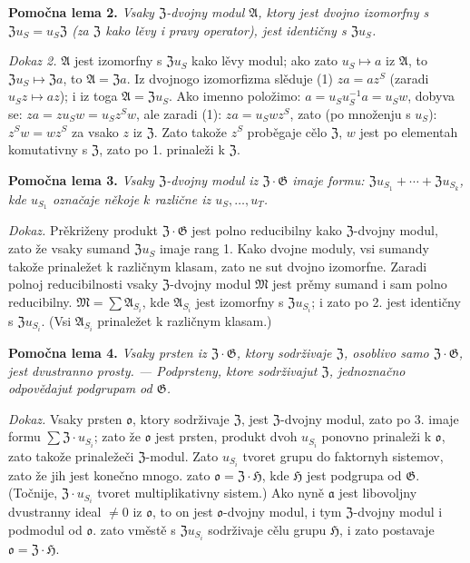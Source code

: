 \documentclass[11pt]{article}
\begin{document}
\noindent\textbf{Pomočna lema 2.} \emph{Vsaky \(\mathfrak Z\)-dvojny modul \(\mathfrak A\), ktory jest dvojno izomorfny s \(\mathfrak Zu_S=u_S\mathfrak Z\) (za \(\mathfrak Z\) kako lěvy i pravy operator), jest identičny s \(\mathfrak Zu_S\).}

\noindent\emph{Dokaz 2.} \(\mathfrak A\) jest izomorfny s \(\mathfrak Zu_S\) kako lěvy modul; ako zato \(u_S\mapsto a\) iz \(\mathfrak A\), to \(\mathfrak Zu_S\mapsto\mathfrak Za\), to \(\mathfrak A=\mathfrak Za\). Iz dvojnogo izomorfizma slěduje (1) \(za=az^S\) (zaradi \(u_Sz\mapsto az\)); i iz toga \(\mathfrak A=\mathfrak Zu_S\). Ako imenno položimo: \(a=u_Su_S^{-1}a=u_Sw\), dobyva se: \(za=zu_Sw=u_Sz^Sw\), ale zaradi (1): \(za=u_Swz^S\), zato (po množenju s \(u_S\)): \(z^Sw=wz^S\) za vsako \(z\) iz \(\mathfrak Z\). Zato takože \(z^S\) proběgaje cělo \(\mathfrak Z\), \(w\) jest po elementah komutativny s \(\mathfrak Z\), zato po 1. prinaleži k \(\mathfrak Z\).

\noindent\textbf{Pomočna lema 3.} \emph{Vsaky \(\mathfrak Z\)-dvojny modul iz \(\mathfrak Z\cdot\mathfrak G\) imaje formu: \(\mathfrak Zu_{S_1}+\cdots+\mathfrak Zu_{S_k}\), kde \(u_{S_1}\) označaje někoje \(k\) različne iz \(u_S,\ldots,u_T\).}

\noindent\emph{Dokaz.} Prěkriženy produkt \(\mathfrak Z\cdot\mathfrak G\) jest polno reducibilny kako \(\mathfrak Z\)-dvojny modul, zato že vsaky sumand \(\mathfrak Zu_S\) imaje rang 1. Kako dvojne moduly, vsi sumandy takože prinaležet k različnym klasam, zato ne sut dvojno izomorfne. Zaradi polnoj reducibilnosti vsaky \(\mathfrak Z\)-dvojny modul \(\mathfrak M\) jest prěmy sumand i sam polno reducibilny. \(\mathfrak M=\sum\mathfrak A_{S_i}\), kde \(\mathfrak A_{S_i}\) jest izomorfny s \(\mathfrak Zu_{S_i}\); i zato po 2. jest identičny s \(\mathfrak Zu_{S_i}\). (Vsi \(\mathfrak A_{S_i}\) prinaležet k različnym klasam.)

\noindent\textbf{Pomočna lema 4.} \emph{Vsaky prsten iz \(\mathfrak Z\cdot\mathfrak G\), ktory sodrživaje \(\mathfrak Z\), osoblivo samo \(\mathfrak Z\cdot\mathfrak G\), jest dvustranno prosty. --- Podprsteny, ktore sodrživajut \(\mathfrak Z\), jednoznačno odpovědajut podgrupam od \(\mathfrak G\).}

\noindent\emph{Dokaz.} Vsaky prsten \(\mathfrak o\), ktory sodrživaje \(\mathfrak Z\), jest \(\mathfrak Z\)-dvojny modul, zato po 3. imaje formu \(\sum\mathfrak Z\cdot u_{S_i}\); zato že \(\mathfrak o\) jest prsten, produkt dvoh \(u_{S_i}\) ponovno prinaleži k \(\mathfrak o\), zato takože prinaležeči \(\mathfrak Z\)-modul. Zato \(u_{S_i}\) tvoret grupu do faktornyh sistemov, zato že jih jest konečno mnogo. zato \(\mathfrak o=\mathfrak Z\cdot\mathfrak H\), kde \(\mathfrak H\) jest podgrupa od \(\mathfrak G\). (Točnije, \(\mathfrak Z\cdot u_{S_i}\) tvoret multiplikativny sistem.) Ako nyně \(\mathfrak a\) jest libovoljny dvustranny ideal \(\neq0\) iz \(\mathfrak o\), to on jest \(\mathfrak o\)-dvojny modul, i tym \(\mathfrak Z\)-dvojny modul i podmodul od \(\mathfrak o\). zato vměstě s \(\mathfrak Zu_{S_i}\) sodrživaje cělu grupu \(\mathfrak H\), i zato postavaje \(\mathfrak o=\mathfrak Z\cdot\mathfrak H\).
\end{document}
